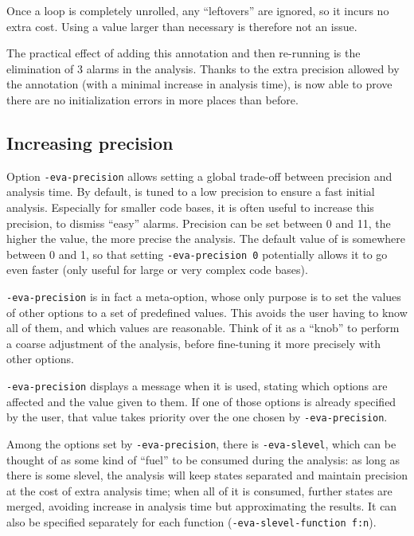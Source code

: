 \documentclass{frama-c-book}
\begin{document}
Once a loop is completely unrolled, any ``leftovers'' are ignored, so it incurs
no extra cost. Using a value larger than necessary is therefore not an issue.

The practical effect of adding this annotation and then re-running \Eva{} is
the elimination of 3 alarms in the analysis. Thanks to the extra precision
allowed by the annotation (with a minimal increase in analysis time), \Eva{}
is now able to prove there are no initialization errors in more places than
before.

\subsection{Increasing precision}

Option \verb|-eva-precision| allows setting a global trade-off between
precision and analysis time. By default, \Eva{} is tuned to a low precision
to ensure a fast initial analysis. Especially for smaller code bases, it is
often useful to increase this precision, to dismiss ``easy'' alarms.
Precision can be set between 0 and 11, the higher the value, the more precise
the analysis. The default value of \Eva{} is somewhere between 0 and 1, so that
setting \verb|-eva-precision 0| potentially allows it to go even faster
(only useful for large or very complex code bases).

\verb|-eva-precision| is in fact a meta-option, whose only purpose is to set
the values of other options to a set of predefined values. This avoids the user
having to know all of them, and which values are reasonable. Think of it as a
``knob'' to perform a coarse adjustment of the analysis, before fine-tuning
it more precisely with other options.

\verb|-eva-precision| displays a message when it is used, stating which options
are affected and the value given to them. If one of those options is already
specified by the user, that value takes priority over the one chosen by
\verb|-eva-precision|.

Among the options set by \verb|-eva-precision|, there is \verb|-eva-slevel|,
which can be thought of as some kind of ``fuel''
to be consumed during the analysis: as long as there is some slevel,
the analysis will keep states separated and maintain precision at the cost of
extra analysis time; when all of
it is consumed, further states are merged, avoiding increase in analysis time
but approximating the results. It can also be
specified separately for each function (\verb|-eva-slevel-function f:n|).
\end{document}
